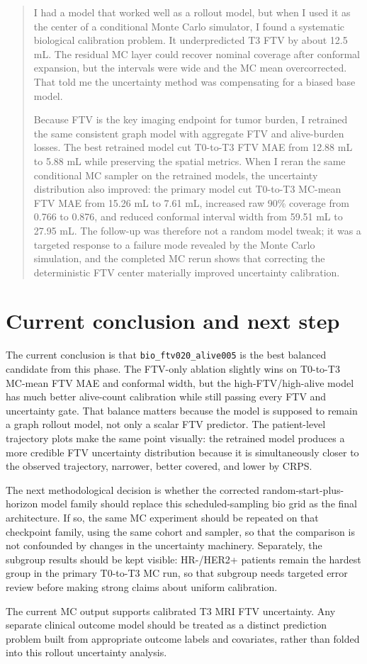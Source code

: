 \documentclass[11pt]{article}
\begin{document}
\begin{quote}
I had a model that worked well as a rollout model, but when I used it as the
center of a conditional Monte Carlo simulator, I found a systematic biological
calibration problem. It underpredicted T3 FTV by about 12.5 mL. The residual MC
layer could recover nominal coverage after conformal expansion, but the
intervals were wide and the MC mean overcorrected. That told me the uncertainty
method was compensating for a biased base model.

Because FTV is the key imaging endpoint for tumor burden, I retrained the same
consistent graph model with aggregate FTV and alive-burden losses. The best
retrained model cut T0-to-T3 FTV MAE from 12.88 mL to 5.88 mL while preserving
the spatial metrics. When I reran the same conditional MC sampler on the
retrained models, the uncertainty distribution also improved: the primary model
cut T0-to-T3 MC-mean FTV MAE from 15.26 mL to 7.61 mL, increased raw 90\%
coverage from 0.766 to 0.876, and reduced conformal interval width from
59.51 mL to 27.95 mL. The follow-up was therefore not a random model tweak; it
was a targeted response to a failure mode revealed by the Monte Carlo
simulation, and the completed MC rerun shows that correcting the deterministic
FTV center materially improved uncertainty calibration.
\end{quote}

\section{Current conclusion and next step}

The current conclusion is that \texttt{bio\_ftv020\_alive005} is the best
balanced candidate from this phase. The FTV-only ablation slightly wins on
T0-to-T3 MC-mean FTV MAE and conformal width, but the high-FTV/high-alive model
has much better alive-count calibration while still passing every FTV and
uncertainty gate. That balance matters because the model is supposed to remain a
graph rollout model, not only a scalar FTV predictor. The patient-level
trajectory plots make the same point visually: the retrained model produces a
more credible FTV uncertainty distribution because it is simultaneously closer
to the observed trajectory, narrower, better covered, and lower by CRPS.

The next methodological decision is whether the corrected random-start-plus-
horizon model family should replace this scheduled-sampling bio grid as the
final architecture. If so, the same MC experiment should be repeated on that
checkpoint family, using the same cohort and sampler, so that the comparison is
not confounded by changes in the uncertainty machinery. Separately, the
subgroup results should be kept visible: HR-/HER2+ patients remain the hardest
group in the primary T0-to-T3 MC run, so that subgroup needs targeted error
review before making strong claims about uniform calibration.

The current MC output supports calibrated T3 MRI FTV uncertainty. Any separate
clinical outcome model should be treated as a distinct prediction problem built
from appropriate outcome labels and covariates, rather than folded into this
rollout uncertainty analysis.
\end{document}
